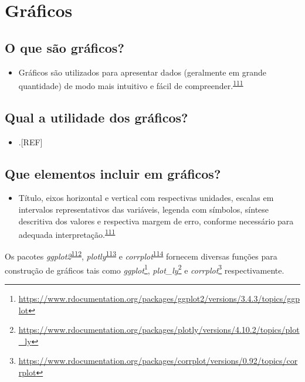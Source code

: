 \documentclass[
  a4paper,
]{book}
\providecommand{\tightlist}{%
  \setlength{\itemsep}{0pt}\setlength{\parskip}{0pt}}
\renewcommand{\href}[2]{#2\footnote{\url{#1}}}
\newenvironment{infobox}[1]
  {
  \begin{itemize}
  \renewcommand{\labelitemi}{
    \raisebox{-.7\height}[0pt][0pt]{
      {\setkeys{Gin}{width=3em,keepaspectratio}
        \texttt{[image: \#1]}}
    }
  }
  \setlength{\fboxsep}{1em}
  \begin{blackbox}
  \item
  }
  {
  \end{blackbox}
  \end{itemize}
  }
\begin{document}
\hypertarget{graficos}{%
\section{Gráficos}\label{graficos}}

\hypertarget{o-que-suxe3o-gruxe1ficos}{%
\subsection{O que são gráficos?}\label{o-que-suxe3o-gruxe1ficos}}

\begin{itemize}
\tightlist
\item
  Gráficos são utilizados para apresentar dados (geralmente em grande quantidade) de modo mais intuitivo e fácil de compreender.\textsuperscript{\protect\hyperlink{ref-Park2022}{111}}
\end{itemize}

\hypertarget{qual-a-utilidade-dos-gruxe1ficos}{%
\subsection{Qual a utilidade dos gráficos?}\label{qual-a-utilidade-dos-gruxe1ficos}}

\begin{itemize}
\tightlist
\item
  .{[}REF{]}
\end{itemize}

\hypertarget{que-elementos-incluir-em-gruxe1ficos}{%
\subsection{Que elementos incluir em gráficos?}\label{que-elementos-incluir-em-gruxe1ficos}}

\begin{itemize}
\tightlist
\item
  Título, eixos horizontal e vertical com respectivas unidades, escalas em intervalos representativos das variáveis, legenda com símbolos, síntese descritiva dos valores e respectiva margem de erro, conforme necessário para adequada interpretação.\textsuperscript{\protect\hyperlink{ref-Park2022}{111}}
\end{itemize}

\begin{infobox}{images/Rlogo}
Os pacotes \emph{ggplot2}\textsuperscript{\protect\hyperlink{ref-ggplot2}{112}}, \emph{plotly}\textsuperscript{\protect\hyperlink{ref-plotly}{113}} e \emph{corrplot}\textsuperscript{\protect\hyperlink{ref-corrplot}{114}} fornecem diversas funções para construção de gráficos tais como \href{https://www.rdocumentation.org/packages/ggplot2/versions/3.4.3/topics/ggplot}{\emph{ggplot}}, \href{https://www.rdocumentation.org/packages/plotly/versions/4.10.2/topics/plot_ly}{\emph{plot\_ly}} e \href{https://www.rdocumentation.org/packages/corrplot/versions/0.92/topics/corrplot}{\emph{corrplot}} respectivamente.

\end{infobox}
\end{document}
